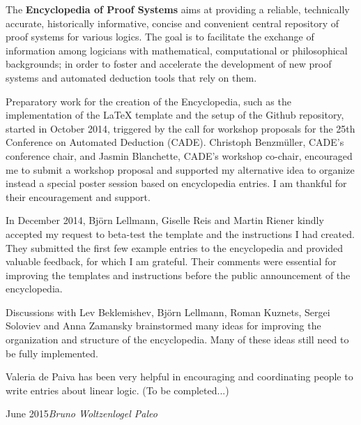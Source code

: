 
\preface

The \textbf{Encyclopedia of Proof Systems} aims at providing a reliable, technically accurate, historically informative, concise and convenient central repository of proof systems for various logics. The goal is to facilitate the exchange of information among logicians with mathematical, computational or philosophical backgrounds; in order to foster and accelerate the development of new proof systems and automated deduction tools that rely on them.

Preparatory work for the creation of the Encyclopedia, such as the implementation of the LaTeX template and the setup of the Github repository, started in October 2014, triggered by the call for workshop proposals for the 25th Conference on Automated Deduction (CADE). Christoph Benzm\"uller, CADE's conference chair, and Jasmin Blanchette, CADE's workshop co-chair, encouraged me to submit a workshop proposal and supported my alternative idea to organize instead a special poster session based on encyclopedia entries. I am thankful for their encouragement and support.

In December 2014, Bj\"orn Lellmann, Giselle Reis and Martin Riener kindly accepted my request to beta-test the template and the instructions I had created. They submitted the first few example entries to the encyclopedia and provided valuable feedback, for which I am grateful. Their comments were essential for improving the templates and instructions before the public announcement of the encyclopedia.

Discussions with Lev Beklemishev, Bj\"orn Lellmann, Roman Kuznets, Sergei Soloviev and Anna Zamansky brainstormed many ideas for improving the organization and structure of the encyclopedia. Many of these ideas still need to be fully implemented.

Valeria de Paiva has been very helpful in encouraging and coordinating people to write entries about linear logic. (To be completed...)

\vspace{\baselineskip}
\begin{flushright}\noindent
June 2015\hfill {\it Bruno Woltzenlogel Paleo}
\end{flushright}


